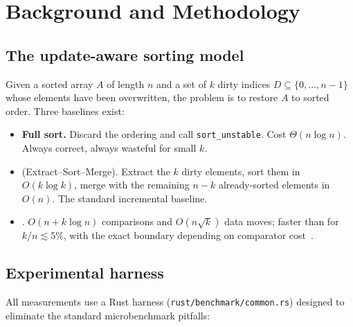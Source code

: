 \section{Background and Methodology}
\label{sec:bg}

\subsection{The update-aware sorting model}

Given a sorted array $A$ of length $n$ and a set of $k$ dirty indices
$D \subseteq \{0,\dots,n-1\}$ whose elements have been overwritten, the
problem is to restore $A$ to sorted order. Three baselines exist:

\begin{itemize}
  \item \textbf{Full sort.} Discard the ordering and call
        \texttt{sort\_unstable}. Cost $\Theta(n \log n)$. Always correct,
        always wasteful for small $k$.
  \item \textbf{\ESM} (Extract--Sort--Merge). Extract the $k$ dirty elements,
        sort them in $O(k \log k)$, merge with the remaining $n-k$ already-sorted
        elements in $O(n)$. The standard incremental baseline.
  \item \textbf{\DeltaSort}. $O(n + k \log n)$ comparisons and $O(n\sqrt{k})$
        data moves; faster than \ESM for $k/n \lesssim 5\%$, with the exact
        boundary depending on comparator cost~\cite{deltasort}.
\end{itemize}

\subsection{Experimental harness}

All measurements use a Rust harness (\texttt{rust/benchmark/common.rs})
designed to eliminate the standard microbenchmark pitfalls:

